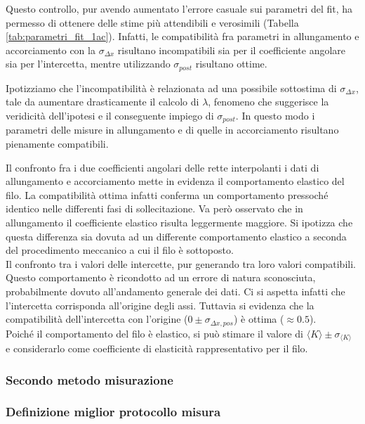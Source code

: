 \documentclass[a4paper,11pt,oneside]{article}
\begin{document}
Questo controllo, pur avendo aumentato l'errore casuale sui parametri del fit, ha permesso di ottenere delle stime più attendibili e verosimili (Tabella \ref{tab:parametri_fit_1ac}). Infatti, le compatibilità fra parametri in allungamento e accorciamento con la $\sigma_{\Delta x}$ risultano incompatibili sia per il coefficiente angolare sia per l'intercetta, mentre utilizzando $\sigma_{post}$ risultano ottime.


Ipotizziamo che l'incompatibilità è relazionata ad una possibile sottostima di $\sigma_{\Delta x}$, tale da aumentare drasticamente il calcolo di  $\lambda$, fenomeno che suggerisce la veridicità dell'ipotesi e il conseguente impiego di $\sigma_{post}$. In questo modo i parametri delle misure in allungamento e di quelle in accorciamento risultano pienamente compatibili.


Il confronto fra i due coefficienti angolari delle rette interpolanti i dati di allungamento e accorciamento mette in evidenza il comportamento elastico del filo. La compatibilità ottima infatti conferma un comportamento pressoché identico nelle differenti fasi di sollecitazione. Va però osservato che in allungamento il coefficiente elastico risulta leggermente maggiore. Si ipotizza che questa differenza sia dovuta ad un differente comportamento elastico a seconda del procedimento meccanico a cui il filo è sottoposto.\\
Il confronto tra i valori delle intercette, pur generando tra loro valori compatibili. Questo comportamento è ricondotto ad un errore di natura sconosciuta, probabilmente dovuto all'andamento generale dei dati. Ci si aspetta infatti che l'intercetta corrisponda all'origine degli assi. Tuttavia si evidenza che la compatibilità dell'intercetta con l'origine ($0\pm \sigma_{\Delta x, pos}$) è ottima ($\approx \num{0.5}$).\\
Poiché il comportamento del filo è elastico, si può stimare il valore di $\langle K \rangle \pm \sigma_{\langle K \rangle}$ e considerarlo come coefficiente di elasticità rappresentativo per il filo.

\subsubsection*{Secondo metodo misurazione}


\subsubsection*{Definizione miglior protocollo misura}
\end{document}
